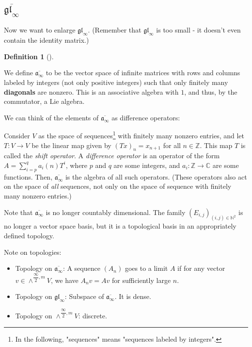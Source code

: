 \documentclass
[numbers=enddot,12pt,final,onecolumn,german,notitlepage]{scrartcl}%
\theoremstyle{definition}
\newtheorem{defi}[theo]{Definition}
\newenvironment{definition}[1][]
{\begin{defi}[#1]\begin{leftbar}}
{\end{leftbar}\end{defi}}
\begin{document}
\subsection{$\overline{\mathfrak{gl}_{\infty}}$}

Now we want to enlarge $\mathfrak{gl}_{\infty}$. (Remember that $\mathfrak{gl}%
_{\infty}$ is too small - it doesn't even contain the identity matrix.)

\begin{definition}
We define $\overline{\mathfrak{a}_{\infty}}$ to be the vector space of
infinite matrices with rows and columns labeled by integers (not only positive
integers) such that only finitely many \textbf{diagonals} are nonzero. This is
an associative algebra with $1$, and thus, by the commutator, a Lie algebra.
\end{definition}

We can think of the elements of $\overline{\mathfrak{a}_{\infty}}$ as
difference operators:

Consider $V$ as the space of sequences\footnote{In the following, "sequences"
means "sequences labeled by integers".} with finitely many nonzero entries,
and let $T:V\rightarrow V$ be the linear map given by $\left(  Tx\right)
_{n}=x_{n+1}$ for all $n\in\mathbb{Z}$. This map $T$ is called the
\textit{shift operator}. A \textit{difference operator} is an operator of the
form $A=\sum\limits_{i=p}^{q}a_{i}\left(  n\right)  T^{i}$, where $p$ and $q$
are some integers, and $a_{i}:\mathbb{Z}\rightarrow\mathbb{C}$ are some
functions. Then, $\overline{\mathfrak{a}_{\infty}}$ is the algebra of all such
operators. (These operators also act on the space of \textit{all} sequences,
not only on the space of sequence with finitely many nonzero entries.)

Note that $\overline{\mathfrak{a}_{\infty}}$ is no longer countably
dimensional. The family $\left(  E_{i,j}\right)  _{\left(  i,j\right)
\in\mathbb{N}^{2}}$ is no longer a vector space basis, but it is a topological
basis in an appropriately defined topology.

Note on topologies:

\begin{itemize}
\item Topology on $\overline{\mathfrak{a}_{\infty}}$: A sequence $\left(
A_{n}\right)  $ goes to a limit $A$ if for any vector $v\in\wedge
^{\dfrac{\infty}{2},m}V$, we have $A_{n}v=Av$ for sufficiently large $n$.

\item Topology on $\mathfrak{gl}_{\infty}$: Subspace of $\overline
{\mathfrak{a}_{\infty}}$. It is dense.

\item Topology on $\wedge^{\dfrac{\infty}{2},m}V$: discrete.
\end{itemize}
\end{document}
